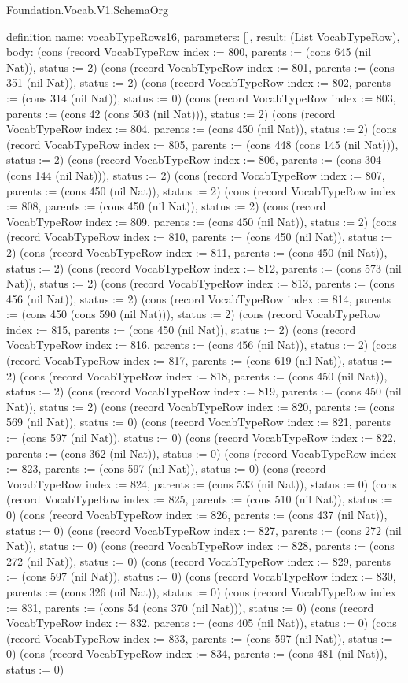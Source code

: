\begin{lexlean}{Foundation.Vocab.V1.SchemaOrg}
\begin{semanticmodule}
definition{
  name: vocabTypeRows16,
  parameters: [],
  result: (List VocabTypeRow),
  body: (cons (record VocabTypeRow {index := 800, parents := (cons 645 (nil Nat)), status := 2}) (cons (record VocabTypeRow {index := 801, parents := (cons 351 (nil Nat)), status := 2}) (cons (record VocabTypeRow {index := 802, parents := (cons 314 (nil Nat)), status := 0}) (cons (record VocabTypeRow {index := 803, parents := (cons 42 (cons 503 (nil Nat))), status := 2}) (cons (record VocabTypeRow {index := 804, parents := (cons 450 (nil Nat)), status := 2}) (cons (record VocabTypeRow {index := 805, parents := (cons 448 (cons 145 (nil Nat))), status := 2}) (cons (record VocabTypeRow {index := 806, parents := (cons 304 (cons 144 (nil Nat))), status := 2}) (cons (record VocabTypeRow {index := 807, parents := (cons 450 (nil Nat)), status := 2}) (cons (record VocabTypeRow {index := 808, parents := (cons 450 (nil Nat)), status := 2}) (cons (record VocabTypeRow {index := 809, parents := (cons 450 (nil Nat)), status := 2}) (cons (record VocabTypeRow {index := 810, parents := (cons 450 (nil Nat)), status := 2}) (cons (record VocabTypeRow {index := 811, parents := (cons 450 (nil Nat)), status := 2}) (cons (record VocabTypeRow {index := 812, parents := (cons 573 (nil Nat)), status := 2}) (cons (record VocabTypeRow {index := 813, parents := (cons 456 (nil Nat)), status := 2}) (cons (record VocabTypeRow {index := 814, parents := (cons 450 (cons 590 (nil Nat))), status := 2}) (cons (record VocabTypeRow {index := 815, parents := (cons 450 (nil Nat)), status := 2}) (cons (record VocabTypeRow {index := 816, parents := (cons 456 (nil Nat)), status := 2}) (cons (record VocabTypeRow {index := 817, parents := (cons 619 (nil Nat)), status := 2}) (cons (record VocabTypeRow {index := 818, parents := (cons 450 (nil Nat)), status := 2}) (cons (record VocabTypeRow {index := 819, parents := (cons 450 (nil Nat)), status := 2}) (cons (record VocabTypeRow {index := 820, parents := (cons 569 (nil Nat)), status := 0}) (cons (record VocabTypeRow {index := 821, parents := (cons 597 (nil Nat)), status := 0}) (cons (record VocabTypeRow {index := 822, parents := (cons 362 (nil Nat)), status := 0}) (cons (record VocabTypeRow {index := 823, parents := (cons 597 (nil Nat)), status := 0}) (cons (record VocabTypeRow {index := 824, parents := (cons 533 (nil Nat)), status := 0}) (cons (record VocabTypeRow {index := 825, parents := (cons 510 (nil Nat)), status := 0}) (cons (record VocabTypeRow {index := 826, parents := (cons 437 (nil Nat)), status := 0}) (cons (record VocabTypeRow {index := 827, parents := (cons 272 (nil Nat)), status := 0}) (cons (record VocabTypeRow {index := 828, parents := (cons 272 (nil Nat)), status := 0}) (cons (record VocabTypeRow {index := 829, parents := (cons 597 (nil Nat)), status := 0}) (cons (record VocabTypeRow {index := 830, parents := (cons 326 (nil Nat)), status := 0}) (cons (record VocabTypeRow {index := 831, parents := (cons 54 (cons 370 (nil Nat))), status := 0}) (cons (record VocabTypeRow {index := 832, parents := (cons 405 (nil Nat)), status := 0}) (cons (record VocabTypeRow {index := 833, parents := (cons 597 (nil Nat)), status := 0}) (cons (record VocabTypeRow {index := 834, parents := (cons 481 (nil Nat)), status := 0}) }
\end{semanticmodule}
\end{lexlean}
